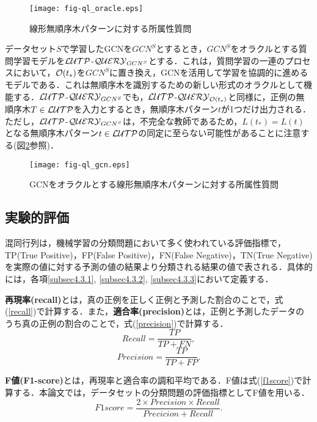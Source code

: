 \begin{figure}[tb]
  \centering
  \texttt{[image: fig-ql\_oracle.eps]}
  \caption{線形無順序木パターンに対する所属性質問}\label{fig:ql_oracle}
\end{figure}

データセット$S$で学習したGCNを$GCN^S$とするとき，$GCN^S$をオラクルとする質問学習モデルを${\cal LUTP}$-${\cal QUERY}_{GCN^S}$とする．これは，質問学習の一連のプロセスにおいて，${\cal O}(t_{\ast})$を$GCN^S$に置き換え，GCNを活用して学習を協調的に進めるモデルである．これは無順序木を識別するための新しい形式のオラクルとして機能する．${\cal LUTP}$-${\cal QUERY}_{GCN^S}$でも，${\cal LUTP}$-${\cal QUERY}_{{\cal O}(t_{\ast})}$と同様に，正例の無順序木$T\in {\cal LUTP}$を入力とするとき，無順序木パターン$t$が1つだけ出力される．ただし，${\cal LUTP}$-${\cal QUERY}_{GCN^S}$は，不完全な教師であるため，$L(t_{\ast})=L(t)$となる無順序木パターン$t\in{\cal LUTP}$の同定に至らない可能性があることに注意する(図\ref{fig:ql_gcn}参照)．

\begin{figure}[tb]
  \centering
  \texttt{[image: fig-ql\_gcn.eps]}
  \caption{GCNをオラクルとする線形無順序木パターンに対する所属性質問}\label{fig:ql_gcn}
\end{figure}

\subsection{実験的評価}
混同行列は，機械学習の分類問題において多く使われている評価指標で，TP(True Positive)，FP(False Positive)，FN(False Negative)，TN(True Negative)を実際の値に対する予測の値の結果より分類される結果の値で表される．具体的には，各項\ref{subsec4.3.1}, \ref{subsec4.3.2}, \ref{subsec4.3.3}において定義する．

\textbf{再現率(recall)}とは，真の正例を正しく正例と予測した割合のことで，式(\ref{recall})で計算する．また，\textbf{適合率(precision)}とは，正例と予測したデータのうち真の正例の割合のことで，式(\ref{precision})で計算する．
\begin{equation}
  \label{recall}
  Recall=\frac{TP}{TP+FN},
\end{equation}
\begin{equation}
  \label{precision}
  Precision=\frac{TP}{TP+FP}.
\end{equation}

\textbf{F値(F1-score)}とは，再現率と適合率の調和平均である．F値は式(\ref{f1score})で計算する．本論文では，データセットの分類問題の評価指標としてF値を用いる．
\begin{equation}
  \label{f1score}
  F1 score=\frac{2\times Precision\times Recall}{Precicion+Recall}.
\end{equation}



